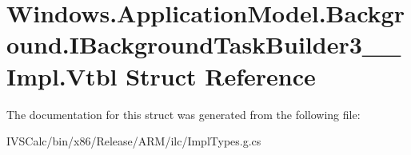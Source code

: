 \hypertarget{struct_windows_1_1_application_model_1_1_background_1_1_i_background_task_builder3_____impl_1_1_vtbl}{}\section{Windows.\+Application\+Model.\+Background.\+I\+Background\+Task\+Builder3\+\_\+\+\_\+\+Impl.\+Vtbl Struct Reference}
\label{struct_windows_1_1_application_model_1_1_background_1_1_i_background_task_builder3_____impl_1_1_vtbl}


The documentation for this struct was generated from the following file\+:\begin{DoxyCompactItemize}
\item 
I\+V\+S\+Calc/bin/x86/\+Release/\+A\+R\+M/ilc/Impl\+Types.\+g.\+cs\end{DoxyCompactItemize}
